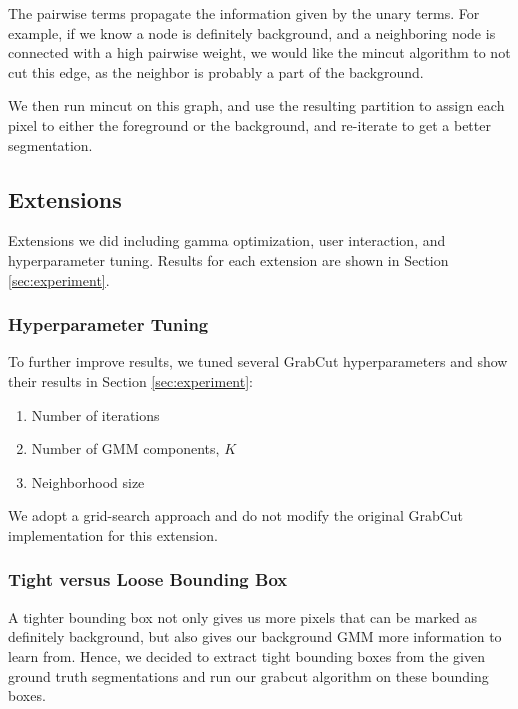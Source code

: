 \documentclass[10pt,twocolumn,letterpaper]{article}
\begin{document}
The pairwise terms propagate the information given by the unary terms. For example, if we know a node is definitely background, and a neighboring node is connected with a high pairwise weight, we would like the mincut algorithm to not cut this edge, as the neighbor is probably a part of the background. 

We then run mincut on this graph, and use the resulting partition to assign each pixel to either the foreground or the background, and re-iterate to get a better segmentation.



\subsection{Extensions}
Extensions we did including gamma optimization, user interaction, and hyperparameter tuning. Results for each extension are shown in Section \ref{sec:experiment}.
\subsubsection{Hyperparameter Tuning}
To further improve results, we tuned several GrabCut hyperparameters and show their results in Section \ref{sec:experiment}:
\begin{enumerate}[topsep=4pt,itemsep=0ex,partopsep=1ex,parsep=0.5ex]
\item Number of iterations
\item Number of GMM components, $K$
\item Neighborhood size
\end{enumerate}
We adopt a grid-search approach and do not modify the original GrabCut implementation for this extension.

\subsubsection{Tight versus Loose Bounding Box}
A tighter bounding box not only gives us more pixels that can be marked as definitely background, but also gives our background GMM more information to learn from. Hence, we decided to extract tight bounding boxes from the given ground truth segmentations and run our grabcut algorithm on these bounding boxes.
\end{document}
